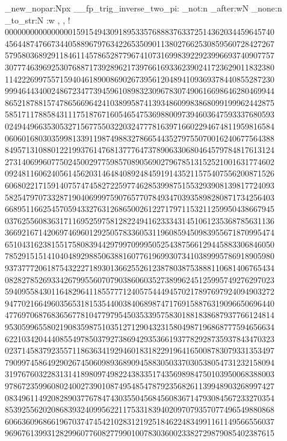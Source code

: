{{  }
\cs_new_nopar:Npx \__fp_trig_inverse_two_pi:
  {
    \exp_not:n { \exp_after:wN \use_none:n \token_to_str:N }
    \cs:w , , !
    0000000000000000159154943091895335768883763372514362034459645740 ~
    4564487476673440588967976342265350901138027662530859560728427267 ~
    5795803689291184611457865287796741073169983922923996693740907757 ~
    3077746396925307688717392896217397661693362390241723629011832380 ~
    1142226997557159404618900869026739561204894109369378440855287230 ~
    9994644340024867234773945961089832309678307490616698646280469944 ~
    8652187881574786566964241038995874139348609983868099199962442875 ~
    5851711788584311175187671605465475369880097394603647593337680593 ~
    0249449663530532715677550322032477781639716602294674811959816584 ~
    0606016803035998133911987498832786654435279755070016240677564388 ~
    8495713108801221993761476813777647378906330680464579784817613124 ~
    2731406996077502450029775985708905690279678513152521001631774602 ~
    0924811606240561456203146484089248459191435211575407556200871526 ~
    6068022171591407574745827225977462853998751553293908139817724093 ~
    5825479707332871904069997590765770784934703935898280871734256403 ~
    6689511662545705943327631268650026122717971153211259950438667945 ~
    0376255608363171169525975812822494162333431451061235368785631136 ~
    3669216714206974696012925057833605311960859450983955671870995474 ~
    6510431623815517580839442979970999505254387566129445883306846050 ~
    7852915151410404892988506388160776196993073410389995786918905980 ~
    9373777206187543222718930136625526123878038753888110681406765434 ~
    0828278526933426799556070790386060352738996245125995749276297023 ~
    5940955843011648296411855777124057544494570217897697924094903272 ~
    9477021664960356531815354400384068987471769158876319096650696440 ~
    4776970687683656778104779795450353395758301881838687937766124814 ~
    9530599655802190835987510351271290432315804987196868777594656634 ~
    6221034204440855497850379273869429353661937782928735937843470323 ~
    0237145837923557118636341929460183182291964165008783079331353497 ~
    7909974586492902674506098936890945883050337030538054731232158094 ~
    3197676032283131418980974982243833517435698984750103950068388003 ~
    9786723599608024002739010874954854787923568261139948903268997427 ~
    0834961149208289037767847430355045684560836714793084567233270354 ~
    8539255620208683932409956221175331839402097079357077496549880868 ~
    6066360968661967037474542102831219251846224834991161149566556037 ~
    9696761399312829960776082779901007830360023382729879085402387615 ~
}}
